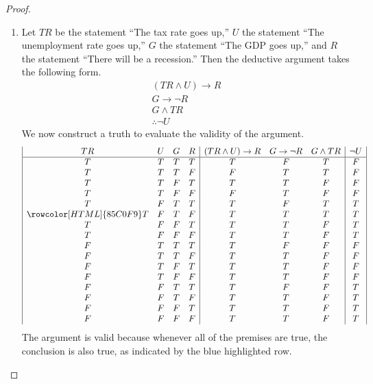 \documentclass[12pt]{amsart}
\theoremstyle{definition}
\theoremstyle{remark}
\begin{document}
\begin{proof}
\begin{enumerate}
	\item Let $TR$ be the statement ``The tax rate goes up,'' $U$ the statement ``The unemployment rate goes up,'' $G$ the statement ``The GDP goes up,'' and $R$ the statement ``There will be a recession.''
	Then the deductive argument takes the following form.
	\begin{equation*}
		\begin{array}{l}
			(TR \wedge U) \rightarrow R \\
			G \rightarrow \neg R \\
			G \wedge TR \\
			\hline
			\therefore \neg U
		\end{array}
	\end{equation*}
	We now construct a truth to evaluate the validity of the argument.
	\begin{equation*}
		\begin{array}{| c c c c | c c c | c |}
			TR & U & G & R & (TR \wedge U) \rightarrow R & G \rightarrow \neg R & G \wedge TR & \neg U \\
			\hline
			T & T & T & T & T & F & T & F \\
			T & T & T & F & F & T & T & F \\
			T & T & F & T & T & T & F & F \\
			T & T & F & F & F & T & F & F \\
			T & F & T & T & T & F & T & T \\
			\rowcolor[HTML]{85C0F9} T & F & T & F & T & T & T & T \\
			T & F & F & T & T & T & F & T \\
			T & F & F & F & T & T & F & T \\
			F & T & T & T & T & F & F & F \\
			F & T & T & F & T & T & F & F \\
			F & T & F & T & T & T & F & F \\
			F & T & F & F & T & T & F & F \\
			F & F & T & T & T & F & F & T \\
			F & F & T & F & T & T & F & T \\
			F & F & F & T & T & T & F & T \\
			F & F & F & F & T & T & F & T
		\end{array}
	\end{equation*}
	The argument is valid because whenever all of the premises are true, the conclusion is also true, as indicated by the blue highlighted row.
	

\end{enumerate}
\end{proof}
\end{document}
